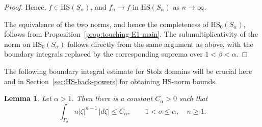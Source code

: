 \documentclass[11pt]{amsart}
\numberwithin{equation}{section}
\newtheorem{lemma}[theorem]{Lemma}
\theoremstyle{definition}
\theoremstyle{plain}
\newcommand{\HS}{\mathrm{HS}}
\begin{document}
\begin{proof}
Hence,
\(f\in\HS(S_\alpha)\), and \(f_n\to f\) in
\(\HS(S_\alpha)\) as $n \to \infty.$

The equivalence of the two norms, and hence the completeness of
\(\HS_0(S_\alpha)\), follows from
Proposition~\ref{prop:touching-E1-main}. The submultiplicativity of the norm
on \(\HS_0(S_\alpha)\) follows directly from the same argument as above,
with the boundary integrals replaced by the corresponding suprema over
\(1<\beta<\alpha\).
\end{proof}

The following boundary integral estimate for Stolz domains
will be crucial here and in Section~\ref{sec:HS-back-powers}
for obtaining $\HS$-norm bounds.


\begin{lemma}\label{lem:kernel-bound-Stolz}
Let \(\alpha>1\). Then there is a constant \(C_\alpha>0\) such that
\[
        \int_{\Gamma_\sigma} n|\zeta|^{n-1}\,|d\zeta|
        \le C_\alpha,
        \qquad 1<\sigma\le \alpha,\quad n\ge1 .
\]
\end{lemma}
\end{document}
